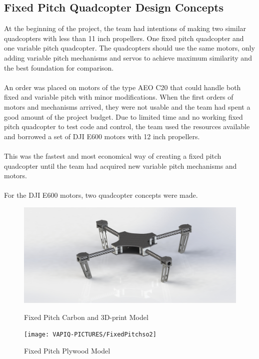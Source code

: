 \subsection{Fixed Pitch Quadcopter Design Concepts}
At the beginning of the project, the team had intentions of making two similar quadcopters with less than 11 inch propellers. One fixed pitch quadcopter and one variable pitch quadcopter. The quadcopters should use the same motors, only adding variable pitch mechanisms and servos to achieve maximum similarity and the best foundation for comparison. 
\\\\
An order was placed on motors of the type AEO C20 that could handle both fixed and variable pitch with minor modifications.
When the first orders of motors and mechanisms arrived, they were not usable and the team had spent a good amount of the project budget. Due to limited time and no working fixed pitch quadcopter to test code and control, the team used the resources available and borrowed a set of DJI E600 motors with 12 inch propellers.
\\\\
This was the fastest and most economical way of creating a fixed pitch quadcopter until the team had acquired new variable pitch mechanisms and motors.
\\\\
For the DJI E600 motors, two quadcopter concepts were made. 
\begin{figure}[h]
        \centering
         \begin{minipage}[b]{0.45\textwidth}
            \includegraphics[width = 1\textwidth]{VAPIQ-PICTURES/FixedPitchConceptCarbon}
              \caption{Fixed Pitch Carbon and 3D-print Model}
            \label{fig:CarbonFPQ}
        \end{minipage}
        \hfill
        \begin{minipage}[b]{0.45\textwidth}
            \texttt{[image: VAPIQ-PICTURES/FixedPitchso2]}
            \caption{Fixed Pitch Plywood Model}
            \label{fig:FPQply}
        \end{minipage}
\end{figure}

